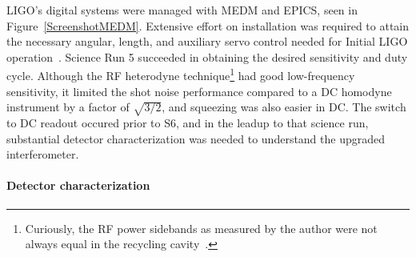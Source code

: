 LIGO's digital systems were managed with MEDM and EPICS, seen in Figure~\ref{ScreenshotMEDM}.
Extensive effort on installation was required to attain the necessary angular, length, and auxiliary servo control needed for Initial LIGO operation~\cite{ReadoutGWA}.
Science Run 5 succeeded in obtaining the desired sensitivity and duty cycle.
Although the RF heterodyne technique\footnote{Curiously, the RF power sidebands as measured by the author were not always equal in the recycling cavity~\cite{MeadorsHanford2005}.} had good low-frequency sensitivity, it limited the shot noise performance compared to a DC homodyne instrument by a factor of $\sqrt{3/2}$, and squeezing was also easier in DC.
The switch to DC readout occured prior to S6, and in the leadup to that science run, substantial detector characterization was needed to understand the upgraded interferometer.



                \paragraph{Detector characterization}
                \label{detchar}
            

